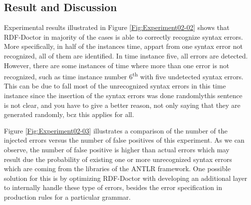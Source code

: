 \subsection{Result and Discussion}

Experimental results illustrated in Figure \ref{Fig:Experiment02-02} shows that RDF-Doctor in majority of the cases is able to correctly recognize syntax errors. 
More specifically, in half of the instances time, appart from one syntax error not recognized, all of them are identified.
In time instance five, all errors are detected.
However, there are some instances of time where more than one error is not recognized, such as time instance number 6\textsuperscript{th} with five undetected syntax errors.
This can be due to fall most of the unrecognized syntax errors in this time instance since the insertion of the syntax errors was done randomly{this sentence is not clear, and you have to give a better reason, not only saying that they are generated randomly, bcz this applies for all}.

Figure \ref{Fig:Experiment02-03} illustrates a comparison of the number of the injected errors versus the number of false positives of this experiment. 
As we can observe, the number of false positive is higher than actual errors which may result due the probability of existing one or more unrecognized syntax errors which are coming from the libraries of the ANTLR framework. 
One possible solution for this is by optimizing RDF-Doctor with developing an additional layer to internally handle these type of errors, besides the error specification in production rules for a particular grammar.


